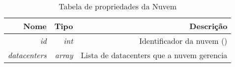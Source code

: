 \begin{table}[!htb]
    \centering
    \caption[Representação da Cloud]{Tabela de propriedades da Nuvem
    \label{tab:cloud-shape}}
    \begin{tabular}{rrr}
        \toprule
            Nome & Tipo & Descrição \\ 
        \midrule
            \textit{id} & \textit{int} & Identificador da nuvem () \\
            \textit{datacenters} & \textit{array} & Lista de datacenters que a nuvem gerencia \\
        \bottomrule
    \end{tabular}
\end{table}


